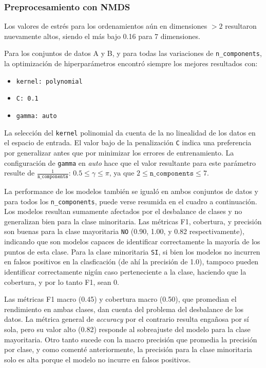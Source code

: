 \documentclass[10 pt]{article}
\begin{document}
\subsubsection{Preprocesamiento con NMDS}


Los valores de estrés para los ordenamientos aún en dimensiones \(>2\) resultaron nuevamente altos, siendo el más bajo 0.16 para 7 dimensiones.

Para los conjuntos de datos A y B, y para todas las variaciones de \texttt{n\_components}, la optimización de hiperparámetros encontró siempre los mejores resultados con:

\begin{itemize}
    \item \texttt{kernel: polynomial}
    \item \texttt{C: 0.1}
    \item \texttt{gamma: auto}
\end{itemize}

La selección del \texttt{kernel} polinomial da cuenta de la no linealidad de los datos en el espacio de entrada. El valor bajo de la penalización \texttt{C} indica una preferencia por generalizar antes que por minimizar los errores de entrenamiento. La configuración de \texttt{gamma} en \textit{auto} hace que el valor resultante para este parámetro resulte de \(\frac{1}{\texttt{n\_components}}\): \(0.5 \leq \gamma \leq \pi\), ya que \(2 \leq \texttt{n\_components} \leq 7\). 


La performance de los modelos también se igualó en ambos conjuntos de datos y para todos los \texttt{n\_components}, puede verse resumida en el cuadro  a continuación. Los modelos resultan sumamente afectados por el desbalance de clases y no generalizan bien para la clase minoritaria. Las métricas F1, cobertura, y precisión son buenas para la clase mayoritaria \texttt{NO} (0.90, 1.00, y 0.82 respectivamente), indicando que son modelos capaces de identificar correctamente la mayoría de los puntos de esta clase. Para la clase minoritaria \texttt{SI}, si bien los modelos no incurren en falsos positivos en la clasficación (de ahí la precisión de 1.0), tampoco pueden identificar correctamente nigún caso perteneciente a la clase, haciendo que la cobertura, y por lo tanto F1, sean 0.

Las métricas F1 macro (0.45) y cobertura macro (0.50), que promedian el rendimiento en ambas clases, dan cuenta del problema del desbalance de los datos. La métrica general de \textit{accuracy} por el contrario resulta engañosa por sí sola, pero su valor alto (0.82) responde al sobreajuste del modelo para la clase mayoritaria. Otro tanto sucede con la macro precisión que promedia la precisión por clase, y como comenté anteriormente, la precisión para la clase minoritaria solo es alta porque el modelo no incurre en falsos positivos.
\end{document}
